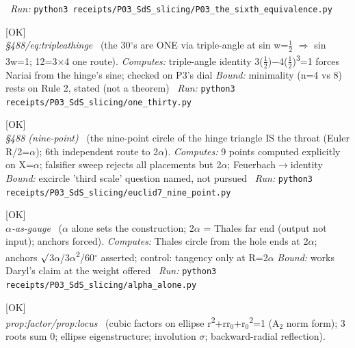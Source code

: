 \begin{description}
\ \emph{Run:} \texttt{python3 receipts/P03\_SdS\_slicing/P03\_the\_sixth\_equivalence.py}
\item[\label{rcpt:one_thirty}\texttt{one\_thirty}]\hfill\textsf{[OK]}\\
\textit{\S{}488/eq:tripleathinge} \ (the 30\ensuremath{^\circ}s are ONE via triple-angle at sin w=\ensuremath{\tfrac12} \ensuremath{\Rightarrow} sin 3w=1; 12=3\ensuremath{\times}4 one route). 
\emph{Computes:} triple-angle identity 3(\ensuremath{\tfrac12})\ensuremath{-}4(\ensuremath{\tfrac12})\textsuperscript{3}=1 forces Nariai from the hinge's sine; checked on P3's dial
 \emph{Bound:} minimality (n=4 vs 8) rests on Rule 2, stated (not a theorem)
\ \emph{Run:} \texttt{python3 receipts/P03\_SdS\_slicing/one\_thirty.py}
\item[\label{rcpt:euclid7_nine_point}\texttt{euclid7\_nine\_point}]\hfill\textsf{[OK]}\\
\textit{\S{}488 (nine-point)} \ (the nine-point circle of the hinge triangle IS the throat (Euler R/2=\ensuremath{\alpha}); 6th independent route to 2\ensuremath{\alpha}). 
\emph{Computes:} 9 points computed explicitly on \textbar{}X\textbar{}=\ensuremath{\alpha}; falsifier sweep rejects all placements but 2\ensuremath{\alpha}; Feuerbach\ensuremath{\to}identity
 \emph{Bound:} excircle 'third scale' question named, not pursued
\ \emph{Run:} \texttt{python3 receipts/P03\_SdS\_slicing/euclid7\_nine\_point.py}
\item[\label{rcpt:alpha_alone}\texttt{alpha\_alone}]\hfill\textsf{[OK]}\\
\textit{\ensuremath{\alpha}-as-gauge} \ (\ensuremath{\alpha} alone sets the construction; 2\ensuremath{\alpha} = Thales far end (output not input); anchors forced). 
\emph{Computes:} Thales circle from the hole ends at 2\ensuremath{\alpha}; anchors \ensuremath{\surd}3\ensuremath{\alpha}/3\ensuremath{\alpha}\textsuperscript{2}/60\ensuremath{^\circ} asserted; control: tangency only at R=2\ensuremath{\alpha}
 \emph{Bound:} works Daryl's claim at the weight offered
\ \emph{Run:} \texttt{python3 receipts/P03\_SdS\_slicing/alpha\_alone.py}
\item[\label{rcpt:P03_cubic_factor_ellipse_locus}\texttt{P03\_cubic\_factor\_ellipse\_locus}]\hfill\textsf{[OK]}\\
\textit{prop:factor/prop:locus} \ (cubic factors on ellipse r\textsuperscript{2}+rr\ensuremath{_0}+r\ensuremath{_0}\textsuperscript{2}=1 (A\ensuremath{_2} norm form); 3 roots sum 0; ellipse eigenstructure; involution \ensuremath{\sigma}; backward-radial reflection). 

\end{description}
